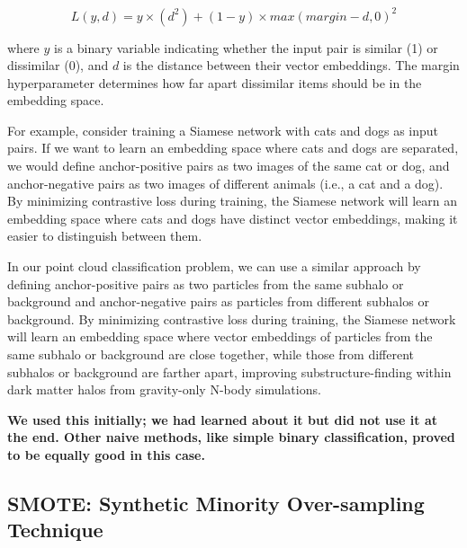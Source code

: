     $$L(y, d) = y \times (d^2) + (1 - y) \times max(margin - d, 0)^2$$
    
    where $y$ is a binary variable indicating whether the input pair is similar (1) or dissimilar (0), and $d$ is the distance between their vector embeddings. The margin hyperparameter determines how far apart dissimilar items should be in the embedding space.

    For example, consider training a Siamese network with cats and dogs as input pairs. If we want to learn an embedding space where cats and dogs are separated, we would define anchor-positive pairs as two images of the same cat or dog, and anchor-negative pairs as two images of different animals (i.e., a cat and a dog). By minimizing contrastive loss during training, the Siamese network will learn an embedding space where cats and dogs have distinct vector embeddings, making it easier to distinguish between them.

    In our point cloud classification problem, we can use a similar approach by defining anchor-positive pairs as two particles from the same subhalo or background and anchor-negative pairs as particles from different subhalos or background. By minimizing contrastive loss during training, the Siamese network will learn an embedding space where vector embeddings of particles from the same subhalo or background are close together, while those from different subhalos or background are farther apart, improving substructure-finding within dark matter halos from gravity-only N-body simulations.

    \textbf{We used this initially; we had learned about it but did not use it at the end. Other naive methods, like simple binary classification, proved to be equally good in this case.}

\subsection{SMOTE: Synthetic Minority Over-sampling Technique}\label{ssec:smote}

